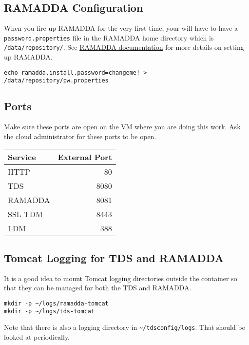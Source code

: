 \documentclass[11pt]{article}
\begin{document}
\subsection*{RAMADDA Configuration}
\label{sec:orgheadline12}

When you fire up RAMADDA for the very first time, your will have to have a \texttt{password.properties} file in the RAMADDA home directory which is \texttt{/data/repository/}. See \href{http://ramadda.org//repository/userguide/toc.html}{RAMADDA documentation} for more details on setting up RAMADDA.

\begin{verbatim}
echo ramadda.install.password=changeme! > /data/repository/pw.properties
\end{verbatim}

\subsection*{Ports}
\label{sec:orgheadline13}

Make sure these ports are open on the VM where you are doing this work. Ask the cloud administrator for these ports to be open.

\begin{center}
\begin{tabular}{lr}
\hline
Service & External Port\\
\hline
HTTP & 80\\
TDS & 8080\\
RAMADDA & 8081\\
SSL TDM & 8443\\
LDM & 388\\
\hline
\end{tabular}
\end{center}

\subsection*{Tomcat Logging for TDS and RAMADDA}
\label{sec:orgheadline14}

It is a good idea to mount Tomcat logging directories outside the container so that they can be managed for both the TDS and RAMADDA.

\begin{verbatim}
mkdir -p ~/logs/ramadda-tomcat
mkdir -p ~/logs/tds-tomcat
\end{verbatim}

Note that there is also a logging directory in \texttt{\textasciitilde{}/tdsconfig/logs}. That should be looked at periodically.
\end{document}
